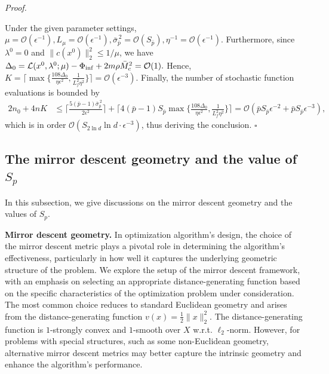 \documentclass[11pt]{article}
\newenvironment{proof}[1][Proof]{%
    \par\noindent\textit{#1.}\enspace
  }{%
    \hfill\ensuremath{\square}\par
  }%
\numberwithin{equation}{section}
\begin{document}
\begin{proof}
Under the given parameter settings,
\(\mu=\mathcal O(\epsilon^{-1}),
L_\mu=\mathcal O(\epsilon^{-1}),
\bar\sigma_{\bar p}^{\,2}
=\mathcal O(S_{\bar p}),
\eta^{-1}=\mathcal O(\epsilon^{-1}).\)
Furthermore, since \(\lambda^0=0\) and
\(\|c(x^0)\|_2^2\le1/\mu\), we have
\(\Delta_0
=\mathcal L(x^0,\lambda^0;\mu)-\Phi_{\rm inf}+2m\rho \bar{M}_c^2
=\mathcal O(1).\)
Hence,
\(K
=\lceil
\max\{
\frac{108\Delta_0}{\eta\epsilon^2},
\frac{1}{L_f^2\eta^2}\}
\rceil
=\mathcal O(\epsilon^{-3}).\)
Finally, the number of stochastic function evaluations is
bounded by
\[
\begin{aligned}
2n_0+4nK
&\le\lceil\frac{5(\bar p-1)\bar\sigma_{\bar p}^{\,2}}{2\epsilon^2}\rceil+\lceil4(\bar p-1)S_{\bar p}\max\{\frac{108\Delta_0}{\eta\epsilon^2},\frac{1}{L_f^2\eta^2}\}\rceil                 =\mathcal O(\bar pS_{\bar p}\epsilon^{-2}+\bar pS_{\bar p}\epsilon^{-3})   ,
\end{aligned}
\]
which is in order $\mathcal O(S_{2\ln d}\ln d\cdot\epsilon^{-3})$, thus deriving the conclusion. 
\end{proof}


\subsection[The mirror descent geometry and the value of Sp]{The mirror descent geometry and the value of $S_p$}
\label{ssec:cpx} 
In this subsection, we give discussions on  the mirror descent geometry and the values of \(S_p\).

{\bf Mirror descent geometry.}
In optimization algorithm's design, the choice of the mirror descent metric plays a pivotal role in determining the algorithm's effectiveness, particularly in how well it captures the underlying geometric structure of the problem. 
We explore the setup of the mirror descent framework, with an emphasis on selecting an appropriate distance-generating function based on the specific characteristics of the optimization problem under consideration.
The most common choice reduces to standard Euclidean geometry and arises from the distance-generating function  \( v(x) = \frac{1}{2} \|x\|_2^2 \). 
The distance-generating function is \(1\)-strongly convex and $1$-smooth over $X$ w.r.t. \(\ell_2\)-norm. 
However, for problems with special structures, such as some non-Euclidean geometry, alternative {mirror descent metrics} may better capture the intrinsic geometry and enhance the algorithm's performance. 
\end{document}
